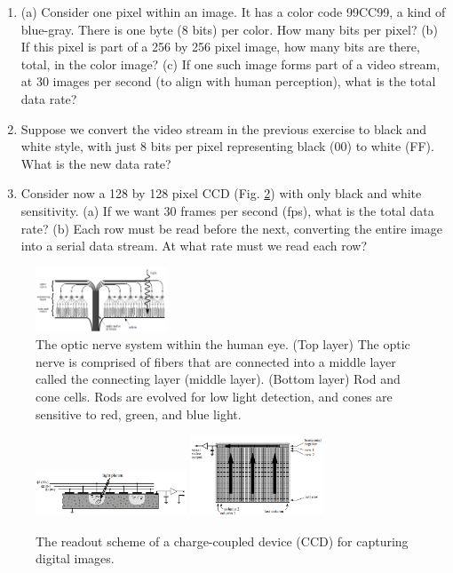 \documentclass{article}
\begin{document}
\begin{enumerate}
\item (a) Consider one pixel within an image.  It has a color code 99CC99, a kind of blue-gray.  There is one byte (8 bits) per color.  How many bits per pixel? (b) If this pixel is part of a 256 by 256 pixel image, how many bits are there, total, in the color image? (c) If one such image forms part of a video stream, at 30 images per second (to align with human perception), what is the total data rate? \\ \vspace{2.5cm}
\item Suppose we convert the video stream in the previous exercise to black and white style, with just 8 bits per pixel representing black (00) to white (FF).  What is the new data rate? \\ \vspace{2cm}
\item Consider now a 128 by 128 pixel CCD (Fig. \ref{fig:2}) with only black and white sensitivity.  (a) If we want 30 frames per second (fps), what is the total data rate? (b) Each row must be read before the next, converting the entire image into a serial data stream.  At what rate must we read each row?
\end{enumerate}

\begin{figure}
\centering
\includegraphics[width=0.35\textwidth]{optic_nerve.png}
\caption{\label{fig:1} The optic nerve system within the human eye. (Top layer) The optic nerve is comprised of fibers that are connected into a middle layer called the connecting layer (middle layer).  (Bottom layer) Rod and cone cells.  Rods are evolved for low light detection, and cones are sensitive to red, green, and blue light.}
\end{figure}

\begin{figure}
\centering
\includegraphics[width=0.4\textwidth]{ccd2.png}
\includegraphics[width=0.35\textwidth]{ccd.png}
\caption{\label{fig:2} The readout scheme of a charge-coupled device (CCD) for capturing digital images.}
\end{figure}
\end{document}
